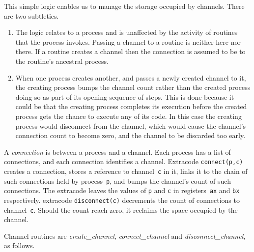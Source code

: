 This simple logic enables us to manage the storage occupied by channels. There are two subtleties.
\begin{enumerate}
	\item
   The logic relates to a process and is unaffected by the activity of routines that the process invokes. Passing a channel to a routine is neither here nor there. If a routine creates a channel then the connection is assumed to be to the routine's ancestral process.
   \item
   When one process creates another, and passes a newly created channel to it, the creating process bumps the channel count rather than the created process doing so as part of its opening sequence of steps. This is done because it could be that the creating process completes its execution before the created process gets the chance to execute any of its code. In this case the creating process would disconnect from the channel, which would cause the channel's connection count to become zero, and the channel to be discarded too early.
\end{enumerate}

A \emph{connection} is between a process and a channel. Each process has a list of connections, and each connection identifies a channel.
Extracode \texttt{connect(p,c)} creates a connection, stores a reference to channel~\texttt{c} in it, links it to the chain of such connections held by process~\texttt{p}, and bumps the channel's count of such connections. The extracode leaves the values of \texttt{p} and \texttt{c} in registers~\texttt{ax} and \texttt{bx} respectively.
extracode \texttt{disconnect(c)} decrements the count of connections to channel~\texttt{c}. Should the count reach zero, it reclaims the space occupied by the channel.

Channel routines are \emph{create\_channel}, \emph{connect\_channel} and \emph{disconnect\_channel}, as follows.

\begin{tabbing}
\indents
{}
\fin
\end{tabbing}

